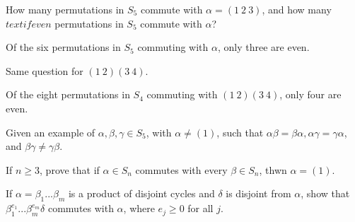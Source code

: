 \documentclass[12pt]{article}
\newenvironment{exercise}[2][Exercise]{\begin{trivlist}
\item[\hskip \labelsep {\bfseries #1}\hskip \labelsep {\bfseries #2.}]}
{\end{trivlist}}
\newenvironment{hint}[2][Hint]{\begin{trivlist}
    \item[\hskip \labelsep {\bfseries #1}\hskip \labelsep {\bfseries #2.}]}
    {\end{trivlist}}
\begin{document}
\begin{exercise}{1.23}
    \begin{enumerate}
        \item[(i)] How many permutations in $S_5$ commute with $\alpha = (1\:2\:3)$, and how many $textif{even}$ permutations in $S_5$ commute with $\alpha$?
        \begin{hint}{}
            Of the six permutations in $S_5$ commuting with $\alpha$, only three are even.
        \end{hint} 
        \item[(ii)] Same question for $(1\:2)(3\:4)$.
        \begin{hint}{}
            Of the eight permutations in $S_4$ commuting with $(1\:2)(3\:4)$, only four are even.
        \end{hint} 
    \end{enumerate}
\end{exercise}



\begin{exercise}{1.24}
    Given an example of $\alpha,\beta,\gamma \in S_5$, with $\alpha \neq(1)$, such that $\alpha\beta = \beta\alpha, \alpha\gamma = \gamma\alpha$, and $\beta\gamma \neq \gamma\beta$.
\end{exercise}



\begin{exercise}{1.25}
    If $n\geq3$, prove that if $\alpha\in S_n$ commutes with every $\beta\in S_n$, thwn $\alpha=(1)$.
\end{exercise}


\begin{exercise}{1.26}
    If $\alpha=\beta_1...\beta_m$ is a product of disjoint cycles and $\delta$ is disjoint from $\alpha$, show that $\beta_1^{e_1}...\beta_m^{e_m}\delta$ commutes with $\alpha$, where $e_j\geq0$ for all $j$.
\end{exercise}
\end{document}
